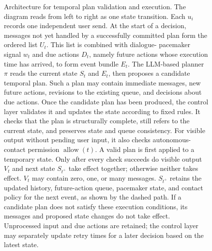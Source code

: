 \documentclass[manuscript,nonacm]{acmart}
\begin{document}
\begin{figure}[t]
  \centering
  \resizebox{0.98\textwidth}{!}{}
  \caption{Architecture for temporal plan validation and execution. The diagram
  reads from left to right as one state transition. Each $u_i$ records one
  independent user send. At the start of a decision, messages not yet handled by
  a successfully committed plan form the ordered list $U_t$. This list is combined with dialogue-
  pacemaker signal $w_t$ and due actions $D_t$, namely future actions whose
  execution time has arrived, to form event bundle $E_t$. The LLM-based planner
  $\pi$ reads the current state $S_t$ and $E_t$, then proposes a candidate
  temporal plan. Such a plan may contain immediate messages, new future actions,
  revisions to the existing queue, and decisions about due actions. Once the
  candidate plan has been produced, the control layer validates it and updates
  the state according to fixed rules. It checks that the plan is structurally
  complete, still refers to the current state, and preserves state and queue
  consistency. For visible output without pending user input, it also checks
  autonomous-contact permission $\operatorname{allow}(t)$. A valid plan is
  first applied to a temporary state.
  Only after every check succeeds do visible output $V_t$ and next state
  $S_{t^+}$ take effect together; otherwise neither takes effect. $V_t$ may
  contain zero, one, or many messages. $S_{t^+}$ retains the updated history,
  future-action queue, pacemaker state, and contact policy for the next event,
  as shown by the dashed path. If a candidate plan does not satisfy these
  execution conditions, its messages and proposed state changes do not take
  effect. Unprocessed input and due actions are retained; the control layer may
  separately update retry times for a later decision based on the latest state.}
  \label{fig:architecture}
\end{figure}
\end{document}
